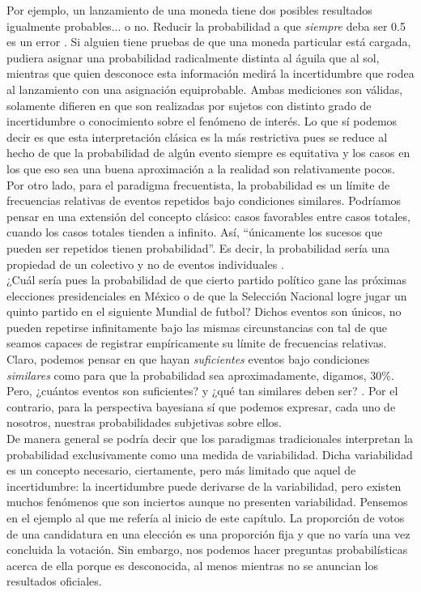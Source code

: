 Por ejemplo, un lanzamiento de una moneda tiene dos posibles resultados igualmente probables... o no. Reducir la probabilidad a que \textit{siempre} deba ser 0.5 es un error \parencite{Nozer17}. Si alguien tiene pruebas de que una moneda particular está cargada, pudiera asignar una probabilidad radicalmente distinta al águila que al sol, mientras que quien desconoce esta información medirá la incertidumbre que rodea al lanzamiento con una asignación equiprobable. Ambas mediciones son válidas, solamente difieren en que son realizadas por sujetos con distinto grado de incertidumbre o conocimiento sobre el fenómeno de interés. Lo que sí podemos decir es que esta interpretación clásica es la más restrictiva pues se reduce al hecho de que la probabilidad de algún evento siempre es equitativa y los casos en los que eso sea una buena aproximación a la realidad son relativamente pocos.\\	 
	 
Por otro lado, para el paradigma frecuentista, la probabilidad es un límite de frecuencias relativas de eventos repetidos bajo condiciones similares. Podríamos pensar en una extensión del concepto clásico: casos favorables entre casos totales, cuando los casos totales tienden a infinito. Así, ``únicamente los sucesos que pueden ser repetidos tienen probabilidad''\parencite{Aquino10}. Es decir, la probabilidad sería una propiedad de un colectivo  y no de eventos individuales \parencite{Nozer17}.\\ 

¿Cuál sería pues la probabilidad de que cierto partido político gane las próximas elecciones presidenciales en México o de que la Selección Nacional logre jugar un quinto partido en el siguiente Mundial de futbol? Dichos eventos son únicos, no pueden repetirse infinitamente bajo las mismas circunstancias con tal de que seamos capaces de registrar empíricamente su límite de frecuencias relativas. Claro, podemos pensar en que hayan \textit{suficientes} eventos bajo condiciones \textit{similares} como para que la probabilidad sea aproximadamente, digamos, 30\%. Pero, ¿cuántos eventos son suficientes? y ¿qué tan similares deben ser? \parencite{Nozer17}. Por el contrario, para la perspectiva bayesiana sí que podemos expresar, cada uno de nosotros, nuestras probabilidades subjetivas sobre ellos.\\ 
	
	De manera general se podría decir que los paradigmas tradicionales interpretan la probabilidad exclusivamente como una medida de variabilidad. Dicha variabilidad es un concepto necesario, ciertamente, pero más limitado que aquel de incertidumbre: la incertidumbre puede derivarse de la variabilidad, pero existen muchos fenómenos que son inciertos aunque no presenten variabilidad. Pensemos en el ejemplo al que me refería al inicio de este capítulo. La proporción de votos de una candidatura en una elección es una proporción fija y que no varía una vez concluida la votación. Sin embargo, nos podemos hacer preguntas probabilísticas acerca de ella porque es desconocida, al menos mientras no se anuncian los resultados oficiales.\\ 
	
